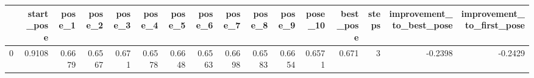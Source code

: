 \begin{tabular}{lrrrrrrrrrrrrrrr}
\toprule
{} &  start\_pose &  pose\_1 &  pose\_2 &  pose\_3 &  pose\_4 &  pose\_5 &  pose\_6 &  pose\_7 &  pose\_8 &  pose\_9 &  pose\_10 &  best\_pose &  steps &  improvement\_to\_best\_pose &  improvement\_to\_first\_pose \\
\midrule
0 &      0.9108 &  0.6679 &  0.6567 &   0.671 &  0.6578 &  0.6648 &  0.6563 &  0.6698 &  0.6583 &  0.6654 &   0.6571 &      0.671 &      3 &                   -0.2398 &                    -0.2429 \\
\bottomrule
\end{tabular}
